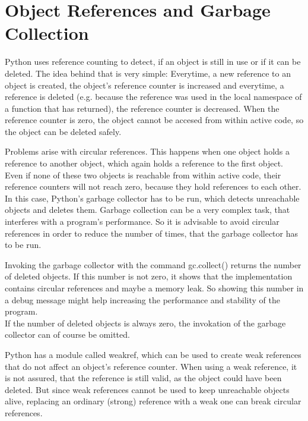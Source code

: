 	\section{Object References and Garbage Collection}
		\label{GarbageCollection}
		Python uses reference counting to detect, if an object is still in use or if it can be deleted.
		The idea behind that is very simple:
		Everytime, a new reference to an object is created, the object's reference counter is increased and everytime, a reference is deleted (e.g. because the reference was used in the local namespace of a function that has returned), the reference counter is decreased.
		When the reference counter is zero, the object cannot be accesed from within active code, so the object can be deleted safely.

		Problems arise with circular references.
		This happens when one object holds a reference to another object, which again holds a reference to the first object.
		Even if none of these two objects is reachable from within active code, their reference counters will not reach zero, because they hold references to each other.\\
		In this case, Python's garbage collector has to be run, which detects unreachable objects and deletes them.
		Garbage collection can be a very complex task, that interferes with a program's performance.
		So it is advisable to avoid circular references in order to reduce the number of times, that the garbage collector has to be run.

		Invoking the garbage collector with the command {\normalfont \ttfamily gc.collect()} returns the number of deleted objects.
		If this number is not zero, it shows that the implementation contains circular references and maybe a memory leak.
		So showing this number in a debug message might help increasing the performance and stability of the program.\\
		If the number of deleted objects is always zero, the invokation of the garbage collector can of course be omitted.

		Python has a module called {\normalfont \ttfamily weakref}, which can be used to create weak references that do not affect an object's reference counter.
		When using a weak reference, it is not assured, that the reference is still valid, as the object could have been deleted.
		But since weak references cannot be used to keep unreachable objects alive, replacing an ordinary (strong) reference with a weak one can break circular references.

